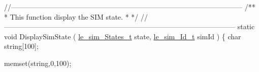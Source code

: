 \begin{DoxyCodeInclude}
\textcolor{comment}{//--------------------------------------------------------------------------------------------------}\textcolor{comment}{}
\textcolor{comment}{/**}
\textcolor{comment}{ * This function display the SIM state.}
\textcolor{comment}{ *}
\textcolor{comment}{ */}
\textcolor{comment}{//--------------------------------------------------------------------------------------------------}
\textcolor{keyword}{static} \textcolor{keywordtype}{void} DisplaySimState
(
    \hyperlink{le__sim__interface_8h_a21b9bb7d5e5e7ece213e00738a5bae41}{le\_sim\_States\_t} state,
    \hyperlink{le__sim__interface_8h_aace49df88426119626fb1ef4e544ccdd}{le\_sim\_Id\_t} simId
)
\{
    \textcolor{keywordtype}{char} \textcolor{keywordtype}{string}[100];

    memset(\textcolor{keywordtype}{string},0,100);


\end{DoxyCodeInclude}
